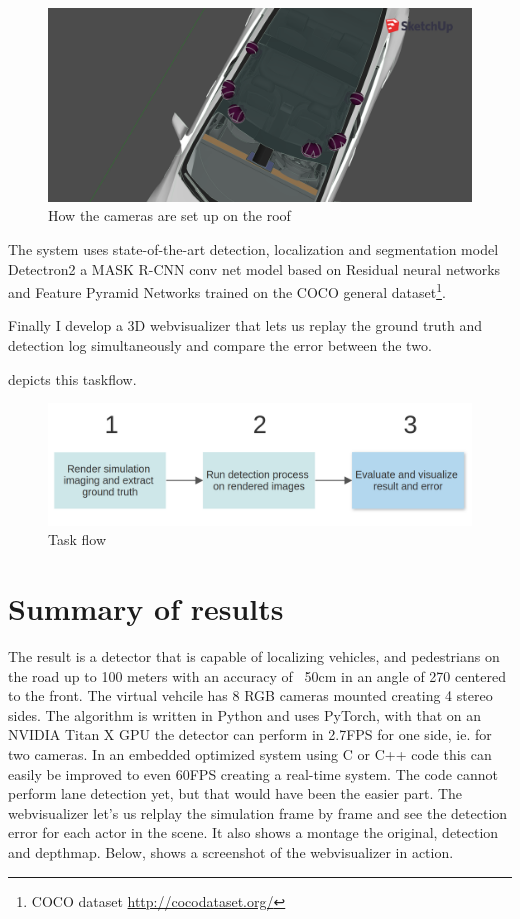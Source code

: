 \begin{figure}[!ht]
    \centering
    \includegraphics[width=150mm, keepaspectratio]{figures/3dmodel2.png}
    \caption{How the cameras are set up on the roof}
    \label{fig:3dmodel2}
\end{figure}

The system uses state-of-the-art detection, localization and segmentation model
Detectron2 \cite{wu2019detectron2} a MASK R-CNN conv net model based on Residual
neural networks and Feature Pyramid Networks trained on the COCO general
dataset\footnote{COCO dataset \url{http://cocodataset.org/}}.

Finally I develop a 3D webvisualizer that lets us replay the ground truth and
detection log simultaneously and compare the error between the two.

 depicts this taskflow.

\begin{figure}[!ht]
    \centering
    \includegraphics[width=150mm, keepaspectratio]{figures/flowchart.png}
    \caption{Task flow}
    \label{fig:flow}
\end{figure}

\section{Summary of results}

The result is a detector that is capable of localizing vehicles, and pedestrians
on the road up to 100 meters with an accuracy of ~50cm in an angle of 270\degree
centered to the front. The virtual vehcile has 8 RGB cameras mounted creating 4
stereo sides. The algorithm is written in Python and uses PyTorch, with that on
an NVIDIA Titan X GPU the detector can perform in 2.7FPS for one side, ie. for
two cameras. In an embedded optimized system using C or C++ code this can easily
be improved to even 60FPS creating a real-time system. The code cannot perform
lane detection yet, but that would have been the easier part. The webvisualizer
let's us relplay the simulation frame by frame and see the detection error for
each actor in the scene. It also shows a montage the original, detection and
depthmap. Below,  shows a screenshot of the webvisualizer
in action.

